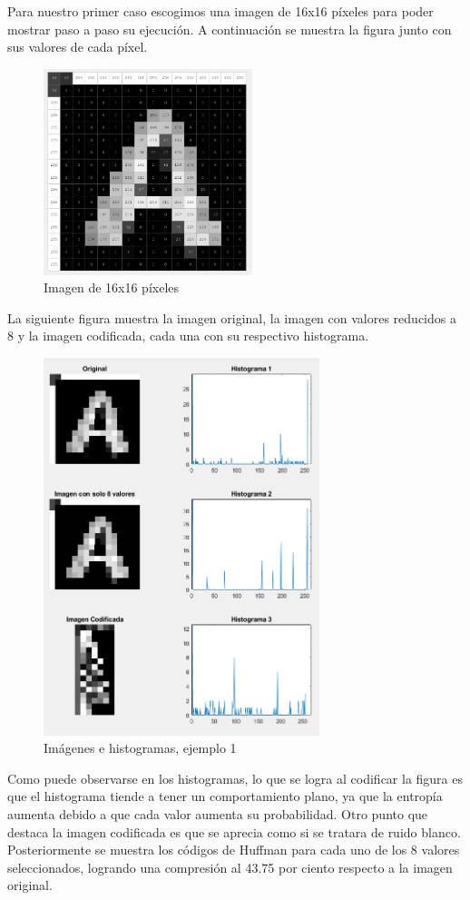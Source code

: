 \documentclass[12pt,twoside]{article}
\begin{document}
    Para nuestro primer caso escogimos una imagen de 16x16 píxeles para poder mostrar paso a paso su ejecución.
    A continuación se muestra la figura junto con sus valores de cada píxel.
    \begin{figure}[H]
            \centering
            \includegraphics[height=6cm]{imagenes/a1.png}
            \caption{Imagen de 16x16 píxeles}
    \end{figure}
        
    La siguiente figura muestra la imagen original, la imagen con valores reducidos a 8 y la imagen codificada, cada una con su respectivo histograma.
    
    \begin{figure}[H]
            \centering
            \includegraphics[height=11cm]{imagenes/a2.png}
            \caption{Imágenes e histogramas, ejemplo 1}
        \end{figure}
    
    Como puede observarse en los histogramas, lo que se logra al codificar la figura es que el histograma tiende a tener un comportamiento plano, ya que la entropía aumenta debido a que cada valor aumenta su probabilidad. Otro punto que destaca la imagen codificada es que se aprecia como si se tratara de ruido blanco.\\
    Posteriormente se muestra los códigos de Huffman para cada uno de los 8 valores seleccionados, logrando una compresión al 43.75 por ciento respecto a la imagen original.
    
\end{document}
